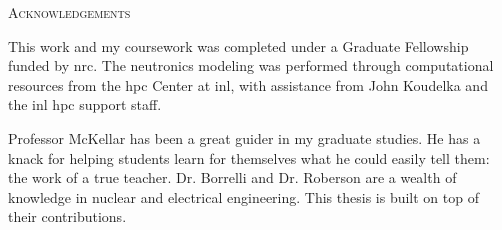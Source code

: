 \begin{center}
   {\LARGE\textsc{Acknowledgements}}

   This work and my coursework was completed under a Graduate Fellowship funded by \acf{nrc}. The neutronics modeling was performed through computational resources from the \acf{hpc} Center at \acf{inl}, with assistance from John Koudelka and the \acs{inl} \acs{hpc} support staff.
   

\vspace{\baselineskip}

   Professor McKellar has been a great guider in my graduate studies. He has a knack for helping students learn for themselves what he could easily tell them: the work of a true teacher. Dr. Borrelli and Dr. Roberson are a wealth of knowledge in nuclear and electrical engineering. This thesis is built on top of their contributions.

\end{center}

